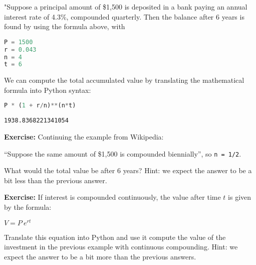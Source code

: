 "Suppose a principal amount of \$1,500 is deposited in a bank paying an
annual interest rate of 4.3\%, compounded quarterly. Then the balance
after 6 years is found by using the formula above, with

\begin{lstlisting}[language=Python]
P = 1500
r = 0.043
n = 4
t = 6
\end{lstlisting}

We can compute the total accumulated value by translating the
mathematical formula into Python syntax:

\begin{lstlisting}[language=Python]
P * (1 + r/n)**(n*t)
\end{lstlisting}

\begin{lstlisting}[]
1938.8368221341054
\end{lstlisting}

\textbf{Exercise:} Continuing the example from Wikipedia:

``Suppose the same amount of \$1,500 is compounded biennially'', so
\passthrough{\lstinline!n = 1/2!}.

What would the total value be after 6 years? Hint: we expect the answer
to be a bit less than the previous answer.

\textbf{Exercise:} If interest is compounded continuously, the value
after time \(t\) is given by the formula:

\(V=P~e^{rt}\)

Translate this equation into Python and use it compute the value of the
investment in the previous example with continuous compounding. Hint: we
expect the answer to be a bit more than the previous answers.

